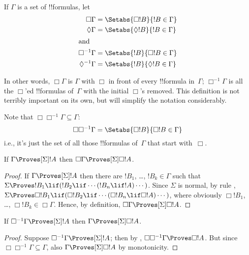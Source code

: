 \documentclass[../../../include/open-logic-section]{subfiles}
\begin{document}
\begin{defn}
  If $\Gamma$ is a set of !!{formula}s, let
  \begin{align*}
    \Box\Gamma & = \Setabs{\Box !B}{!B \in \Gamma}\\
    \Diamond\Gamma & = \Setabs{\Diamond !B}{!B \in \Gamma}\\
    \intertext{and}
    \Box^{-1}\Gamma & = \Setabs{!B}{\Box !B \in \Gamma}\\
    \Diamond^{-1}\Gamma & = \Setabs{!B}{\Diamond !B \in \Gamma}\\
  \end{align*}
\end{defn}

In other words, $\Box\Gamma$ is $\Gamma$ with $\Box$ in front of every
!!{formula} in~$\Gamma$; $\Box^{-1}\Gamma$ is all the $\Box$'ed
!!{formula}s of~$\Gamma$ with the initial $\Box$'s removed.  This
definition is not terribly important on its own, but will simplify the
notation considerably.

Note that $\Box\Box^{-1}\Gamma \subseteq \Gamma$:
\[
\Box\Box^{-1}\Gamma = \Setabs{\Box!B}{\Box!B \in \Gamma}
\]
i.e., it's just the set of all those !!{formula}s of~$\Gamma$ that
start with~$\Box$.

\begin{lem}
  If $\Gamma \Proves[\Sigma] !A$ then $\Box\Gamma \Proves[\Sigma] \Box
  !A$.
\end{lem}

\begin{proof}
  If $\Gamma \Proves[\Sigma] !A$ then there are $!B_1$, \dots, $!B_k
  \in \Gamma$ such that $\Sigma \Proves !B_1 \lif (!B_2 \lif \cdots
  (!B_n \lif !A)\cdots)$. Since $\Sigma$ is normal, by rule \RK{},
  $\Sigma \Proves \Box!B_1 \lif (\Box!B_2 \lif \cdots (\Box!B_n \lif
  \Box!A)\cdots)$, where obviously $\Box!B_1$, \dots, $\Box!B_k \in
  \Box\Gamma$. Hence, by definition, $\Box\Gamma \Proves[\Sigma] \Box
  !A$.
\end{proof}

\begin{lem}
  If $\Box^{-1} \Gamma \Proves[\Sigma] !A$ then $\Gamma
  \Proves[\Sigma] \Box!A$.
\end{lem}

\begin{proof}
  Suppose $\Box^{-1}\Gamma \Proves[\Sigma] !A$; then by
  , $\Box\Box^{-1}\Gamma \Proves \Box!A$. But since
  $\Box\Box^{-1}\Gamma \subseteq \Gamma$, also $\Gamma \Proves[\Sigma]
  \Box!A$ by monotonicity.
\end{proof}
\end{document}

